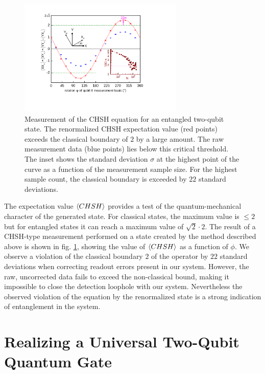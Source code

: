 \begin{figure}[ht!]
	\centering
		\includegraphics[width=0.7\textwidth]{./material/papers/iswap/submission1/Dewes_Figure3}
	\caption[Measurement of the CHSH operator of an entanged two-qubit state]{Measurement of the CHSH equation for an entangled two-qubit state. The renormalized CHSH expectation value (red points) exceeds the classical boundary of $2$ by a large amount. The raw measurement data (blue points) lies below this critical threshold. The inset shows the standard deviation $\sigma$ at the highest point of the curve as a function of the measurement sample size. For the highest sample count, the classical boundary is exceeded by $22$ standard deviations.}
	\label{fig:chsh_measurement}
\end{figure}

The expectation value $\left< CHSH \right>$ provides a test of the quantum-mechanical character of the generated state. For classical states, the maximum value is $\le 2$ but for entangled states it can reach a maximum value of $\sqrt{2}\cdot 2$. The result of a CHSH-type measurement performed on a state created by the method described above is shown in fig. \ref{fig:chsh_measurement}, showing the value of $\left< CHSH \right>$ as a function of $\phi$. We observe a violation of the classical boundary $2$ of the operator by $22$ standard deviations when correcting readout errors present in our system. However, the raw, uncorrected data fails to exceed the non-classical bound, making it impossible to close the detection loophole with our system. Nevertheless the observed violation of the equation by the renormalized state is a strong indication of entanglement in the system.

\section{Realizing a Universal Two-Qubit Quantum Gate}

